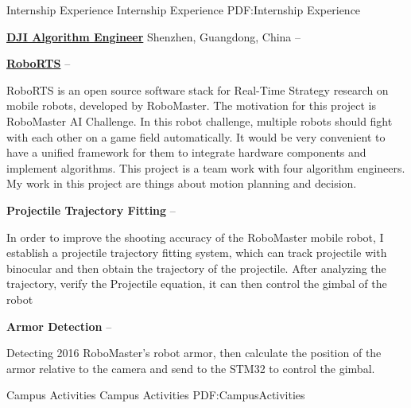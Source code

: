\documentclass[letterpaper,MMMyyyy,nonstopmode]{simpleresumecv}
\begin{document}
\begin{Body}

\Section
{Internship Experience}
{Internship Experience}
{PDF:Internship Experience}

\Entry
\href{https://www.robomaster.com}
{\textbf{DJI Algorithm Engineer}}
Shenzhen, Guangdong, China
\hfill
{} --

\hfill
\Entry
\href{https://github.com/RoboMaster/RoboRTS}
{\textbf{RoboRTS}}
\hfill
{} --
\begin{Detail}
    RoboRTS is an open source software stack for Real-Time Strategy research on mobile robots, 
    developed by RoboMaster. The motivation for this project is RoboMaster AI Challenge. 
    In this robot challenge, multiple robots should fight with each other on a game field automatically. 
    It would be very convenient to have a unified framework for them to integrate hardware components and implement algorithms. 
    This project is a team work with four algorithm engineers. 
    My work in this project are things about motion planning and decision.
\end{Detail}

\BigGap

\Entry
\textbf{Projectile Trajectory Fitting}
\hfill
{} --
\begin{Detail}
    In order to improve the shooting accuracy of the RoboMaster mobile robot, I establish a projectile
    trajectory fitting system, which can track projectile with binocular and then
    obtain the trajectory of the projectile. After analyzing the trajectory, verify the Projectile equation, it can  then control the gimbal of the robot
\end{Detail}

\BigGap

\Entry
\textbf{Armor Detection}
\hfill
{} --
\begin{Detail}
    Detecting 2016 RoboMaster's robot armor, then calculate the position of the armor relative
     to the camera and send to the STM32 to control the gimbal. 
\end{Detail}


\Section
{Campus Activities}
{Campus Activities}
{PDF:CampusActivities}


\end{Body}
\end{document}
